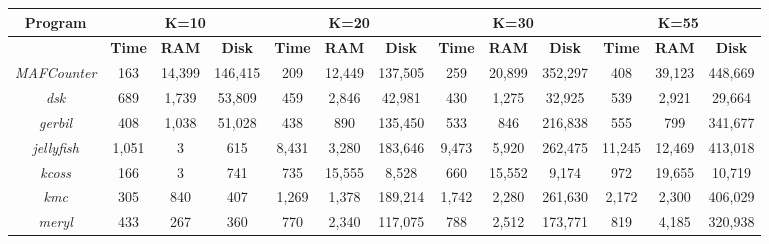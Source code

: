 \documentclass{article}
\begin{document}
\noindent
\setlength{\tabcolsep}{1pt}
\scriptsize
\begin{adjustbox}{max width=\textwidth, max totalheight=\textheight, keepaspectratio}
\begin{tabular}{@{}|c|c|c|c|c|c|c|c|c|c|c|c|c|}
\hline
\textbf{Program} & \multicolumn{3}{c|}{\textbf{K=10}} & \multicolumn{3}{c|}{\textbf{K=20}} & \multicolumn{3}{c|}{\textbf{K=30}} & \multicolumn{3}{c|}{\textbf{K=55}} \\
\hline
 & \textbf{\hspace{2pt}Time\hspace{2pt}} & \textbf{\hspace{2pt}RAM\hspace{2pt}} & \textbf{\hspace{2pt}Disk\hspace{2pt}} & \textbf{\hspace{2pt}Time\hspace{2pt}} & \textbf{\hspace{2pt}RAM\hspace{2pt}} & \textbf{\hspace{2pt}Disk\hspace{2pt}} & \textbf{\hspace{2pt}Time\hspace{2pt}} & \textbf{\hspace{2pt}RAM\hspace{2pt}} & \textbf{\hspace{2pt}Disk\hspace{2pt}} & \textbf{\hspace{2pt}Time\hspace{2pt}} & \textbf{\hspace{2pt}RAM\hspace{2pt}} & \textbf{\hspace{2pt}Disk\hspace{2pt}} \\
\hline
\textit{MAFCounter} & 163 & 14,399 & 146,415 & 209 & 12,449 & 137,505 & 259 & 20,899 & 352,297 & 408 & 39,123 & 448,669 \\
\hline
\textit{dsk} & 689 & 1,739 & 53,809 & 459 & 2,846 & 42,981 & 430 & 1,275 & 32,925 & 539 & 2,921 & 29,664 \\
\hline
\textit{gerbil} & 408 & 1,038 & 51,028 & 438 & 890 & 135,450 & 533 & 846 & 216,838 & 555 & 799 & 341,677 \\
\hline
\textit{jellyfish} & 1,051 & 3 & 615 & 8,431 & 3,280 & 183,646 & 9,473 & 5,920 & 262,475 & 11,245 & 12,469 & 413,018 \\
\hline
\textit{kcoss} & 166 & 3 & 741 & 735 & 15,555 & 8,528 & 660 & 15,552 & 9,174 & 972 & 19,655 & 10,719 \\
\hline
\textit{kmc} & 305 & 840 & 407 & 1,269 & 1,378 & 189,214 & 1,742 & 2,280 & 261,630 & 2,172 & 2,300 & 406,029 \\
\hline
\textit{meryl} & 433 & 267 & 360 & 770 & 2,340 & 117,075 & 788 & 2,512 & 173,771 & 819 & 4,185 & 320,938 \\
\hline
\end{tabular}
\end{adjustbox}
\end{document}
